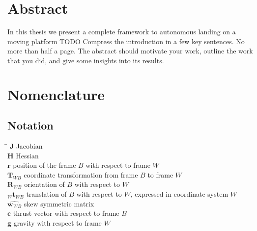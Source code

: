 
 \setcounter{tocdepth}{2}
 \tableofcontents
 \cleardoublepage






\chapter*{Abstract}
In this thesis we present a complete framework to autonomous landing on a moving platform
TODO 
  Compress the introduction in a few key sentences. No more than half a page. The abstract should motivate your work, outline the work that you did, and give some insights into its results.

 \cleardoublepage


\chapter*{Nomenclature}\label{chap:symbole}

\section*{Notation}
  \begin{tabbing}
    \hspace*{1.6cm}   \= \kill
    $\mathbf{J}$       \> Jacobian \\[0.5ex]
    $\mathbf{H}$       \> Hessian \\[0.5ex]
    $\boldsymbol{r}$  \> position of the frame $B$ with respect to frame $W$ \\[0.5ex]
    $\mathbf{T}_{WB}$  \> coordinate transformation from frame $B$ to frame $W$ \\[0.5ex]
    $\mathbf{R}_{WB}$  \> orientation of $B$ with respect to $W$ \\[0.5ex]
    $_W\mathbf{t}_{WB}$\> translation of $B$ with respect to $W$, expressed in coordinate system $W$ \\[0.5ex]
    $\hat{\boldsymbol{w}_{WB}}$ \> skew symmetric matrix \\[0.5ex]
    $\boldsymbol{c}$  \> thrust vector with respect to frame $B$ \\[0.5ex]
    $\boldsymbol{g}$  \> gravity with respect to frame $W$ \\[0.5ex]
  \end{tabbing}
  
